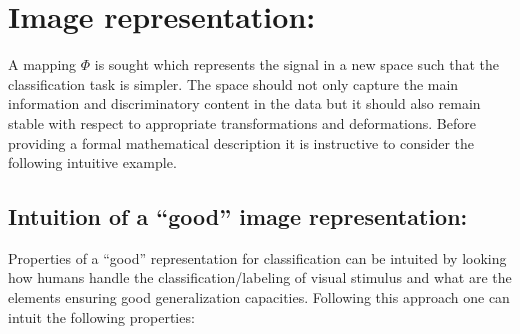 \documentclass[a4paper,11pt]{report}
\begin{document}
	\section{Image representation:}
		\label{sec:Intro/Image rep}
		
		A mapping $\Phi$ is sought which represents the signal in a new space such that the classification task is simpler. The space should not only capture the main information and discriminatory content in the data but it should also remain stable with respect to appropriate transformations and deformations. Before providing a formal mathematical description it is instructive to consider the following intuitive example.
%     
		\subsection{Intuition of a ``good'' image representation:}
      \label{sec:Intro/Image rep/Intuition}
      
      Properties of a ``good'' representation for classification can be intuited by looking how humans handle the classification/labeling of visual stimulus and what are the elements ensuring good generalization capacities. Following this approach one can intuit the following properties:
      
\end{document}
